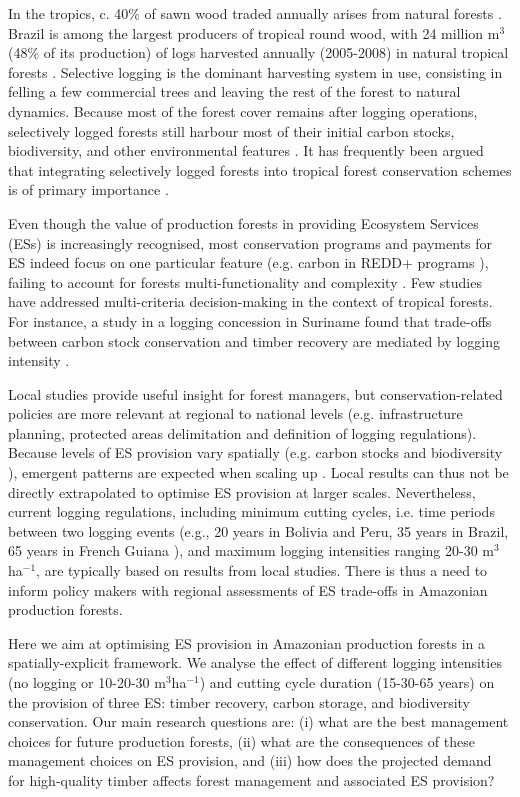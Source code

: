 \documentclass{article}
\begin{document}
In the tropics, c. 40\% of sawn wood traded annually arises from natural forests \cite{Payn2015}. Brazil is among the largest producers of tropical round wood, with 24 million m$^3$ (48\% of its production) of logs harvested annually (2005-2008) in natural tropical forests \cite{Blaser2011}. Selective logging is the dominant harvesting system in use, consisting in felling a few commercial trees and leaving the rest of the forest to natural dynamics. 
Because most of the forest cover remains after logging operations, selectively logged forests still harbour most of their initial carbon stocks, biodiversity, and other environmental features \cite{Putz2012}. 
It has frequently been argued that integrating selectively logged forests into tropical forest conservation schemes is of primary importance \cite{Edwards2014a}. 

Even though the value of production forests in providing Ecosystem Services (ESs) is increasingly recognised, most conservation programs and payments for ES indeed focus on one particular feature (e.g. carbon in REDD+ programs \cite{Laing2016}), failing to account for forests multi-functionality and complexity \cite{VanderPlas2017}. 
Few studies have addressed multi-criteria decision-making in the context of tropical forests. 
For instance, a study in a logging concession in Suriname found that trade-offs between carbon stock conservation and timber recovery are mediated by logging intensity \cite{Roopsind2018}. 

Local studies provide useful insight for forest managers, but conservation-related policies are more relevant at regional to national levels \cite{Hein2006b} (e.g. infrastructure planning, protected areas delimitation and definition of logging regulations). Because levels of ES provision vary spatially (e.g. carbon stocks \cite{Avitabile2016} and biodiversity \cite{Jenkins2013}), emergent patterns are expected when scaling up \cite{Gibson2000}. Local results can thus not be directly extrapolated to optimise ES provision at larger scales.
Nevertheless, current logging regulations, including minimum cutting cycles, i.e. time periods between two logging events (e.g., 20 years in Bolivia and Peru, 35 years in Brazil, 65 years in French Guiana \cite{Blaser2011}), and maximum logging intensities ranging 20-30 m$^3$ha$^{-1}$, are typically based on results from local studies. There is thus a need to inform policy makers with regional assessments of ES trade-offs in Amazonian production forests. 

Here we aim at optimising ES provision in Amazonian production forests in a spatially-explicit framework. We analyse the effect of different logging intensities (no logging or 10-20-30 m$^3$ha$^{-1}$) and cutting cycle duration (15-30-65 years) on the provision of three ES: timber recovery, carbon storage, and biodiversity conservation. Our main research questions are: (i) what are the best management choices for future production forests, (ii) what are the consequences of these management choices on ES provision, and (iii) how does the projected demand for high-quality timber affects forest management and associated ES provision? 
\end{document}
